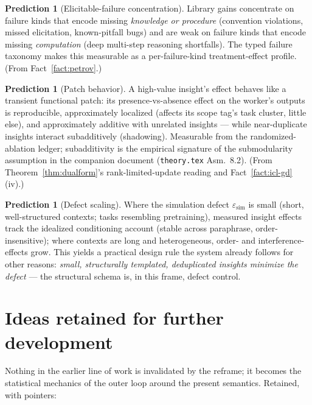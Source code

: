 \documentclass[11pt]{article}
\theoremstyle{plain}
\theoremstyle{definition}
\newtheorem{prediction}[theorem]{Prediction}
\theoremstyle{remark}
\begin{document}
\begin{prediction}[Elicitable-failure concentration]\label{pred:elicit}
Library gains concentrate on failure kinds that encode missing
\emph{knowledge or procedure} (convention violations, missed elicitation,
known-pitfall bugs) and are weak on failure kinds that encode missing
\emph{computation} (deep multi-step reasoning shortfalls). The typed failure
taxonomy makes this measurable as a per-failure-kind treatment-effect
profile. (From Fact~\ref{fact:petrov}.)
\end{prediction}

\begin{prediction}[Patch behavior]\label{pred:patch}
A high-value insight's effect behaves like a transient functional patch:
its presence-vs-absence effect on the worker's outputs is reproducible,
approximately localized (affects its scope tag's task cluster, little
else), and approximately additive with unrelated insights --- while
near-duplicate insights interact subadditively (shadowing). Measurable from
the randomized-ablation ledger; subadditivity is the empirical signature of
the submodularity assumption in the companion document
(\texttt{theory.tex} Asm.~8.2). (From Theorem~\ref{thm:dualform}'s
rank-limited-update reading and Fact~\ref{fact:icl-gd}(iv).)
\end{prediction}

\begin{prediction}[Defect scaling]\label{pred:defect}
Where the simulation defect $\varepsilon_{\mathrm{sim}}$ is small
(short, well-structured contexts; tasks resembling pretraining), measured
insight effects track the idealized conditioning account (stable across
paraphrase, order-insensitive); where contexts are long and heterogeneous,
order- and interference-effects grow. This yields a practical design rule
the system already follows for other reasons: \emph{small, structurally
templated, deduplicated insights minimize the defect} --- the structural
schema is, in this frame, defect control.
\end{prediction}

\section{Ideas retained for further development}\label{sec:revisit}

Nothing in the earlier line of work is invalidated by the reframe; it
becomes the statistical mechanics of the outer loop around the present
semantics. Retained, with pointers:
\end{document}
